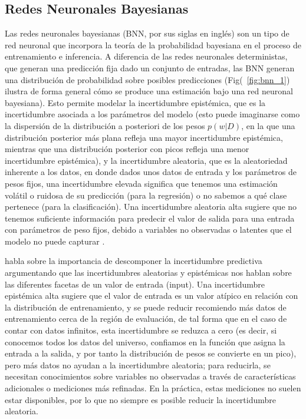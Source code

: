 \documentclass[10pt, oneside, a4paper]{article}
\begin{document}


	
	\subsection{Redes Neuronales Bayesianas} \label{bnn}
	
	Las redes neuronales bayesianas (BNN, por sus siglas en inglés) son un tipo de red neuronal que incorpora la teoría de la probabilidad bayesiana en el proceso de entrenamiento e inferencia. A diferencia de las redes neuronales deterministas, que generan una predicción fija dado un conjunto de entradas, las BNN generan una distribución de probabilidad sobre posibles predicciones (Fig(~\ref{fig:bnn_1}) ilustra de forma general cómo se produce una estimación bajo una red neuronal bayesiana). Esto permite modelar la incertidumbre epistémica, que es la incertidumbre asociada a los parámetros del modelo (esto puede imaginarse como la dispersión de la distribución a posteriori de los pesos $p(w|D)$, en la que una distribución posterior más plana refleja una mayor incertidumbre epistémica, mientras que una distribución posterior con picos refleja una menor incertidumbre epistémica), y la incertidumbre aleatoria, que es la aleatoriedad inherente a los datos, en donde dados unos datos de entrada y los parámetros de pesos fijos, una incertidumbre elevada significa que tenemos una estimación volátil o ruidosa de su predicción (para la regresión) o no sabemos a qué clase pertenece (para la clasificación). Una incertidumbre aleatoria alta sugiere que no tenemos suficiente información para predecir el valor de salida para una entrada con parámetros de peso fijos, debido a variables no observadas o latentes que el modelo no puede capturar \cite{chai2018uncertainty}.
	
	\cite{chai2018uncertainty} habla sobre la importancia de descomponer la incertidumbre predictiva argumentando que las incertidumbres aleatorias y epistémicas nos hablan sobre las diferentes facetas de un valor de entrada (input). Una incertidumbre epistémica alta sugiere que el valor de entrada es un valor atípico en relación con la distribución de entrenamiento, y se puede reducir recomiendo más datos de entrenamiento cerca de la región de evaluación, de tal forma que en el caso de contar con datos infinitos, esta incertidumbre se reduzca a cero (es decir, si conocemos todos los datos del universo, confiamos en la función que asigna la entrada a la salida, y por tanto la distribución de pesos se convierte en un pico), pero más datos no ayudan a la incertidumbre aleatoria; para reducirla, se necesitan conocimientos sobre variables no observadas a través de características adicionales o mediciones más refinadas. En la práctica, estas mediciones no suelen estar disponibles, por lo que no siempre es posible reducir la incertidumbre aleatoria.
\end{document}
